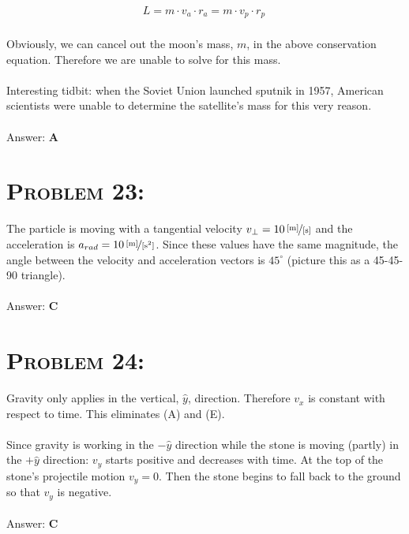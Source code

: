 \documentclass{article}
\begin{document}
\begin{gather}
L = m \cdot v_{a} \cdot r_{a} = m \cdot v_{p} \cdot r_{p}\
\end{gather}
\\
Obviously, we can cancel out the moon's mass, $m$, in the above conservation equation. Therefore we are unable to solve for this mass.\\
\\
Interesting tidbit: when the Soviet Union launched sputnik in 1957, American scientists were unable to determine the satellite's mass for this very reason.
\\\\
Answer: \textbf{\textcolor{ProcessBlue}A}\\


\section{\textsc{Problem 23:}} The particle is moving with a tangential velocity $v_{\perp} = \unitfrac[10]{[m]}{[s]}$ and the acceleration is $a_{rad} = \unitfrac[10]{[m]}{[s^{2}]}$. Since these values have the same magnitude, the angle between the velocity and acceleration vectors is $45^{\circ}$ (picture this as a 45-45-90 triangle).
\\\\
Answer: \textbf{\textcolor{ProcessBlue}C}\\


\section{\textsc{Problem 24:}} Gravity only applies in the vertical, $\hat{y}$, direction. Therefore $v_{x}$ is constant with respect to time. This eliminates (A) and (E).\\
\\
Since gravity is working in the $-\hat{y}$ direction while the stone is moving (partly) in the $+\hat{y}$ direction: $v_{y}$ starts positive and decreases with time. At the top of the stone's projectile motion $v_{y} = 0$. Then the stone begins to fall back to the ground so that $v_{y}$ is negative.
\\\\
Answer: \textbf{\textcolor{ProcessBlue}C}\\
\end{document}
